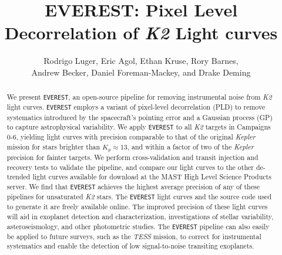 \documentclass[]{emulateapj}
\begin{document}
\title{EVEREST: Pixel Level Decorrelation of \emph{K2} Light curves}

\author{Rodrigo Luger, Eric Agol, Ethan Kruse, Rory Barnes,\\
Andrew Becker, Daniel Foreman-Mackey, and Drake Deming}

\begin{abstract}
We present \texttt{EVEREST}, an open-source pipeline for removing instrumental noise
from \emph{K2} light curves. \texttt{EVEREST} employs a variant of pixel-level decorrelation (PLD) 
to remove systematics introduced by the spacecraft's 
pointing error and a Gaussian process (GP) to capture astrophysical variability. We
apply \texttt{EVEREST} to all \emph{K2} targets in Campaigns 0-6, yielding light curves
with precision comparable to that of the original \emph{Kepler} mission for stars brighter
than $K_p \approx 13$, and within a factor of two of the \emph{Kepler} precision for fainter
targets. We perform cross-validation and transit injection and recovery tests to validate
the pipeline, and compare our light curves to the other de-trended light curves available
for download at the MAST High Level Science Products server. We find that 
\texttt{EVEREST} achieves the highest average precision of any of these pipelines for 
unsaturated \emph{K2} stars. The \texttt{EVEREST} light curves and the source code
used to generate it are freely available online. The improved precision of these
light curves will aid in exoplanet detection and characterization, investigations of stellar
variability, asteroseismology, and other photometric studies. The \texttt{EVEREST} pipeline can
also easily be applied to future surveys, such as the \emph{TESS} mission, to
correct for instrumental systematics and enable the detection of low signal-to-noise transiting
exoplanets.
\end{abstract}
\end{document}
